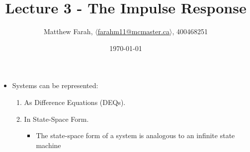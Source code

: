 \documentclass{article}
\title{Lecture 3 - The Impulse Response}
\author{Matthew Farah, \href{mailto:farahm11@mcmaster.ca}{$\langle$farahm11@mcmaster.ca$\rangle$}, 400468251}
\date{\today}
\begin{document}
\maketitle
\pagestyle{fancy}

\begin{itemize}
	\item Systems can be represented:
	\begin{enumerate}
		\item As Difference Equations (DEQs).
		\item In State-Space Form.
		\begin{itemize}
			\item The state-space form of a system is analogous to an infinite state machine
		\end{itemize}
	\end{enumerate}
\end{itemize}
\end{document}
